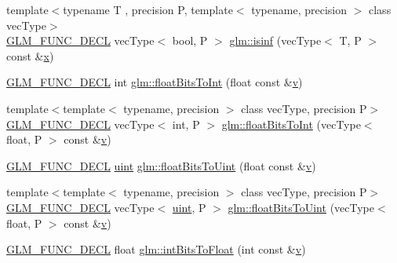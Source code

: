 \begin{DoxyCompactItemize}
\item 
{\footnotesize template$<$typename T , precision P, template$<$ typename, precision $>$ class vec\+Type$>$ }\\\mbox{\hyperlink{setup_8hpp_ab2d052de21a70539923e9bcbf6e83a51}{G\+L\+M\+\_\+\+F\+U\+N\+C\+\_\+\+D\+E\+CL}} vec\+Type$<$ bool, P $>$ \mbox{\hyperlink{group__core__func__common_gaf28f7a4696746f081685c9fd05c7e2de}{glm\+::isinf}} (vec\+Type$<$ T, P $>$ const \&\mbox{\hyperlink{glad_8h_a92d0386e5c19fb81ea88c9f99644ab1d}{x}})
\item 
\mbox{\hyperlink{setup_8hpp_ab2d052de21a70539923e9bcbf6e83a51}{G\+L\+M\+\_\+\+F\+U\+N\+C\+\_\+\+D\+E\+CL}} int \mbox{\hyperlink{group__core__func__common_gadc6a536a7bef046c3293d2ccad6d9ca2}{glm\+::float\+Bits\+To\+Int}} (float const \&\mbox{\hyperlink{glad_8h_a14cfbe2fc2234f5504618905b69d1e06}{v}})
\item 
{\footnotesize template$<$template$<$ typename, precision $>$ class vec\+Type, precision P$>$ }\\\mbox{\hyperlink{setup_8hpp_ab2d052de21a70539923e9bcbf6e83a51}{G\+L\+M\+\_\+\+F\+U\+N\+C\+\_\+\+D\+E\+CL}} vec\+Type$<$ int, P $>$ \mbox{\hyperlink{group__core__func__common_gac4a0710238ae54c67931dd29a0b0f873}{glm\+::float\+Bits\+To\+Int}} (vec\+Type$<$ float, P $>$ const \&\mbox{\hyperlink{glad_8h_a14cfbe2fc2234f5504618905b69d1e06}{v}})
\item 
\mbox{\hyperlink{setup_8hpp_ab2d052de21a70539923e9bcbf6e83a51}{G\+L\+M\+\_\+\+F\+U\+N\+C\+\_\+\+D\+E\+CL}} \mbox{\hyperlink{group__core__precision_ga4fd29415871152bfb5abd588334147c8}{uint}} \mbox{\hyperlink{group__core__func__common_ga748b4d2819b48d28ca09dc8733488873}{glm\+::float\+Bits\+To\+Uint}} (float const \&\mbox{\hyperlink{glad_8h_a14cfbe2fc2234f5504618905b69d1e06}{v}})
\item 
{\footnotesize template$<$template$<$ typename, precision $>$ class vec\+Type, precision P$>$ }\\\mbox{\hyperlink{setup_8hpp_ab2d052de21a70539923e9bcbf6e83a51}{G\+L\+M\+\_\+\+F\+U\+N\+C\+\_\+\+D\+E\+CL}} vec\+Type$<$ \mbox{\hyperlink{group__core__precision_ga4fd29415871152bfb5abd588334147c8}{uint}}, P $>$ \mbox{\hyperlink{group__core__func__common_ga1804d4c443605d8a27be644aa461afe4}{glm\+::float\+Bits\+To\+Uint}} (vec\+Type$<$ float, P $>$ const \&\mbox{\hyperlink{glad_8h_a14cfbe2fc2234f5504618905b69d1e06}{v}})
\item 
\mbox{\hyperlink{setup_8hpp_ab2d052de21a70539923e9bcbf6e83a51}{G\+L\+M\+\_\+\+F\+U\+N\+C\+\_\+\+D\+E\+CL}} float \mbox{\hyperlink{group__core__func__common_ga2650dc57b2148a6ffbce20944fb4d97a}{glm\+::int\+Bits\+To\+Float}} (int const \&\mbox{\hyperlink{glad_8h_a14cfbe2fc2234f5504618905b69d1e06}{v}})

\end{DoxyCompactItemize}
